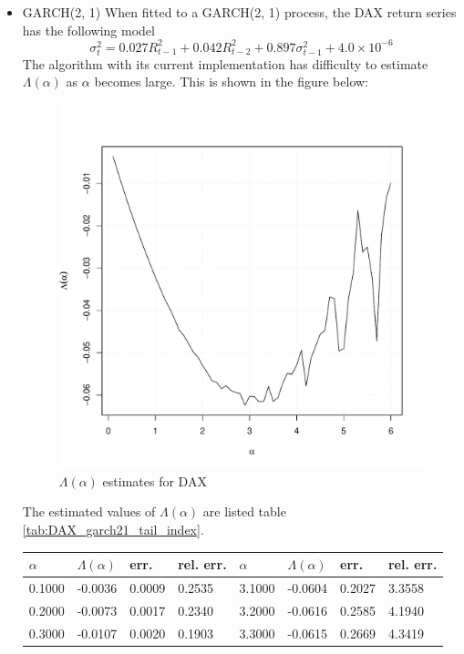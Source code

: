 \documentclass[aoas,preprint]{imsart}
\numberwithin{equation}{section}
\theoremstyle{plain}
\begin{document}
\begin{itemize}
\item GARCH(2, 1)
  When fitted to a GARCH(2, 1) process, the DAX return series has the following model
  \[
  \sigma_t^2 = 0.027 R_{t-1}^2 + 0.042 R_{t-2}^2 + 0.897 \sigma_{t-1}^2 + 4.0 \times 10^{-6}
  \]
  The algorithm with its current implementation has difficulty to
  estimate $\Lambda(\alpha)$ as $\alpha$ becomes large. This is shown
  in the figure below:
  \begin{figure}[htb!]
    \centering
    \includegraphics[width=\textwidth]{DAX_xi.pdf}
    \caption{$\Lambda(\alpha)$ estimates for DAX}
    \label{fig:DAX_garch21_tailindex}
  \end{figure}
  The estimated values of $\Lambda(\alpha)$ are listed table \ref{tab:DAX_garch21_tail_index}.
    \begin{table}[htb!]
    \centering
    \begin{tabular}{l|l|l|l||l|l|l|l}
      $\alpha$ & $\Lambda(\alpha)$ & err. & rel. err. & $\alpha$ & $\Lambda(\alpha)$ & err. & rel. err. \\
      \hline
      0.1000 & -0.0036 & 0.0009 & 0.2535 & 3.1000 & -0.0604 & 0.2027 & 3.3558 \\
      0.2000 & -0.0073 & 0.0017 & 0.2340 & 3.2000 & -0.0616 & 0.2585 & 4.1940 \\
      0.3000 & -0.0107 & 0.0020 & 0.1903 & 3.3000 & -0.0615 & 0.2669 & 4.3419 \\

\end{tabular}
\end{table}
\end{itemize}
\end{document}
